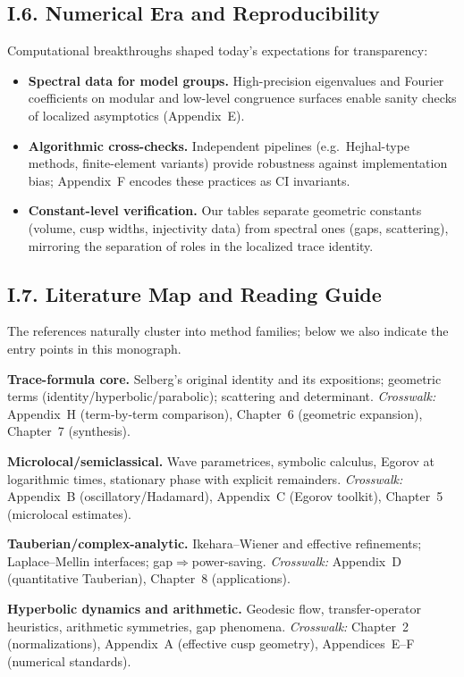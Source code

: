 \subsection*{I.6. Numerical Era and Reproducibility}
\noindent
Computational breakthroughs shaped today’s expectations for transparency:
\begin{itemize}
  \item \textbf{Spectral data for model groups.} High-precision eigenvalues and Fourier coefficients on modular and low-level congruence surfaces enable sanity checks of localized asymptotics (Appendix~E).
  \item \textbf{Algorithmic cross-checks.} Independent pipelines (e.g.\ Hejhal-type methods, finite-element variants) provide robustness against implementation bias; Appendix~F encodes these practices as CI invariants.
  \item \textbf{Constant-level verification.} Our tables separate geometric constants (volume, cusp widths, injectivity data) from spectral ones (gaps, scattering), mirroring the separation of roles in the localized trace identity.
\end{itemize}

\subsection*{I.7. Literature Map and Reading Guide}
\noindent
The references naturally cluster into method families; below we also indicate the entry points in this monograph.

\medskip\noindent
\textbf{Trace-formula core.}
Selberg’s original identity and its expositions; geometric terms (identity/hyperbolic/parabolic); scattering and determinant.  
\emph{Crosswalk:} Appendix~H (term-by-term comparison), Chapter~6 (geometric expansion), Chapter~7 (synthesis).

\medskip\noindent
\textbf{Microlocal/semiclassical.}
Wave parametrices, symbolic calculus, Egorov at logarithmic times, stationary phase with explicit remainders.  
\emph{Crosswalk:} Appendix~B (oscillatory/Hadamard), Appendix~C (Egorov toolkit), Chapter~5 (microlocal estimates).

\medskip\noindent
\textbf{Tauberian/complex-analytic.}
Ikehara–Wiener and effective refinements; Laplace–Mellin interfaces; gap\(\Rightarrow\)power-saving.  
\emph{Crosswalk:} Appendix~D (quantitative Tauberian), Chapter~8 (applications).

\medskip\noindent
\textbf{Hyperbolic dynamics and arithmetic.}
Geodesic flow, transfer-operator heuristics, arithmetic symmetries, gap phenomena.  
\emph{Crosswalk:} Chapter~2 (normalizations), Appendix~A (effective cusp geometry), Appendices~E–F (numerical standards).

